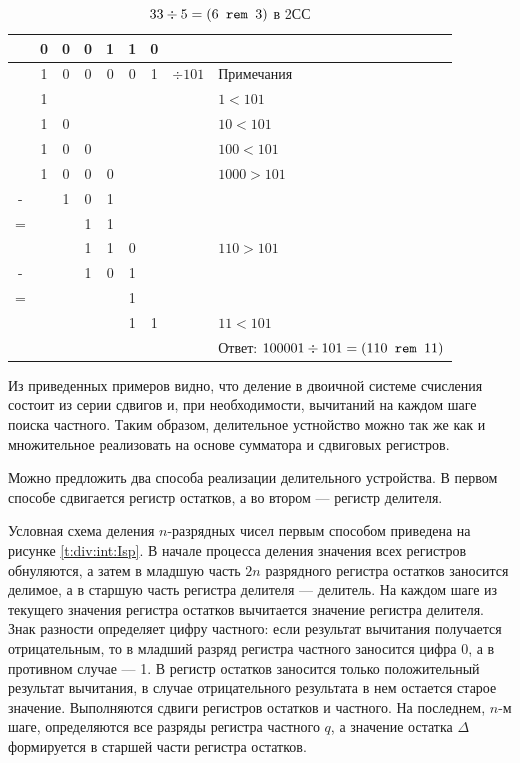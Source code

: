 \begin{table}[!ht]
    \caption{$33\div 5 = (\texttt{$6$ rem $3$})$ в 2СС}
    \label{t:div:int:binaryDiv}
    \centering
    \begin{tabular}{ccccccc|cl}
           
          & 0 & 0 & 0 & 1 & 1 & 0 &              & \\ 
          \hline\hline
          & 1 & 0 & 0 & 0 & 0 & 1 & ${\div 101}$ & Примечания\\
          \hline\hline
          & 1 &   &   &   &   &   &              & $1<101$\\ \hline
          & 1 & 0 &   &   &   &   &              & $10<101$\\ \hline
          & 1 & 0 & 0 &   &   &   &              & $100<101$\\ \hline
          & 1 & 0 & 0 & 0 &   &   &              & $1000>101$\\ 
        - &   & 1 & 0 & 1 &   &   &              & \\ \cline{3-5}
        = &   &   & 1 & 1 &   &   &              & \\ \hline
          &   &   & 1 & 1 & 0 &   &              & $110>101$\\ \hline
        - &   &   & 1 & 0 & 1 &   &              & \\ \cline{4-6}
        = &   &   &   &   & 1 &   &              & \\ \hline
          &   &   &   &   & 1 & 1 &              & $11<101$\\ \hline
          &   &   &   &   &   &   &              & Ответ: $100001\div 101 = (\texttt{$110$ rem $11$})$\\ 
    \end{tabular}
\end{table}

Из приведенных примеров видно, что деление в двоичной системе счисления состоит из серии сдвигов и, при необходимости, вычитаний на каждом шаге поиска частного. Таким образом, делительное устнойство можно так же как и множительное реализовать на основе сумматора и сдвиговых регистров.

Можно предложить два способа реализации делительного устройства. В первом способе сдвигается регистр остатков, а во втором --- регистр делителя.

Условная схема деления $n$-разрядных чисел первым способом приведена на рисунке \ref{t:div:int:Isp}. В начале процесса деления значения всех регистров обнуляются, а затем в младшую часть $2n$ разрядного регистра остатков заносится делимое, а в старшую часть регистра делителя --- делитель. На каждом шаге из текущего значения регистра остатков вычитается значение регистра делителя. Знак разности определяет цифру частного: если результат вычитания получается отрицательным, то в младший разряд регистра частного заносится цифра 0, а в противном случае --- 1. В регистр остатков заносится только положительный результат вычитания, в случае отрицательного результата в нем остается старое значение. Выполняются сдвиги регистров остатков и частного. На последнем, $n$-м шаге, определяются все разряды регистра частного $q$, а значение остатка $\Delta$ формируется в старшей части регистра остатков.

